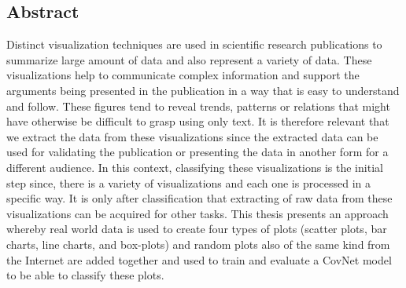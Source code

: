 \begin{titlepage}
\section{Abstract}
Distinct visualization techniques are used in scientific research publications to summarize large amount of data and also represent a variety of data. These visualizations help to communicate complex information and support the arguments being presented in the publication in a way that is easy to understand and follow.
These figures tend to reveal trends, patterns or relations that might have otherwise be difficult to grasp using only text. 
It is therefore relevant that we extract the data from these visualizations since the extracted data can be used for validating the publication or presenting the data in another form for a different audience. In this context, classifying these visualizations is the initial step since, there is a variety of visualizations and each one is processed in a specific way. It is only after classification that extracting of raw data from these visualizations can be acquired for other tasks. This thesis presents an approach whereby real world data is used to create four types of plots (scatter plots, bar charts, line charts, and box-plots) and random plots also of the same kind from the Internet are added together and used to train and evaluate a CovNet model to be able to classify these plots. 


 



\end{titlepage}